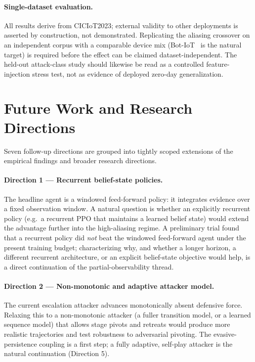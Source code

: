 \paragraph{Single-dataset evaluation.} All results derive from CICIoT2023; external validity to other deployments is asserted by construction, not demonstrated. Replicating the aliasing crossover on an independent corpus with a comparable device mix (Bot-IoT~\cite{Koroniotis2019} is the natural target) is required before the effect can be claimed dataset-independent. The held-out attack-class study should likewise be read as a controlled feature-injection stress test, not as evidence of deployed zero-day generalization.

\section{Future Work and Research Directions}\label{sec:future_work}
Seven follow-up directions are grouped into tightly scoped extensions of the empirical findings and broader research directions.

\paragraph{Direction 1 --- Recurrent belief-state policies.} The headline agent is a windowed feed-forward policy: it integrates evidence over a fixed observation window. A natural question is whether an explicitly recurrent policy (e.g.\ a recurrent PPO that maintains a learned belief state) would extend the advantage further into the high-aliasing regime. A preliminary trial found that a recurrent policy did \emph{not} beat the windowed feed-forward agent under the present training budget; characterizing why, and whether a longer horizon, a different recurrent architecture, or an explicit belief-state objective would help, is a direct continuation of the partial-observability thread.

\paragraph{Direction 2 --- Non-monotonic and adaptive attacker model.} The current escalation attacker advances monotonically absent defensive force. Relaxing this to a non-monotonic attacker (a fuller transition model, or a learned sequence model) that allows stage pivots and retreats would produce more realistic trajectories and test robustness to adversarial pivoting. The evasive-persistence coupling is a first step; a fully adaptive, self-play attacker is the natural continuation (Direction 5).

